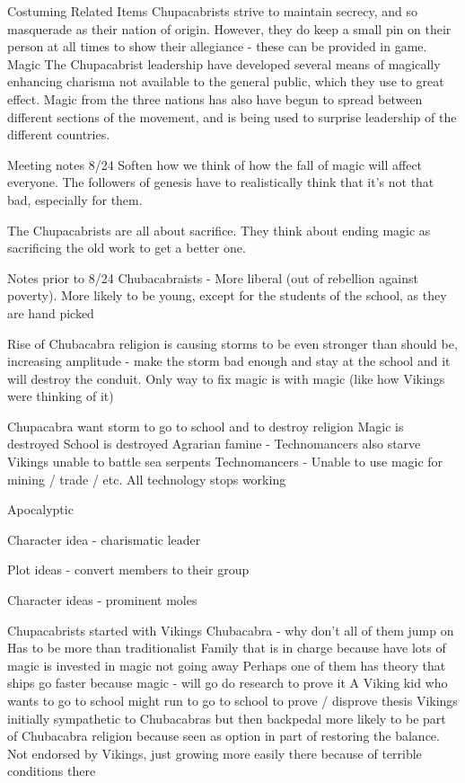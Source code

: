 \documentclass[blue]{GL2020}
\begin{document}
Costuming Related Items
Chupacabrists strive to maintain secrecy, and so masquerade as their nation of origin. However, they do keep a small pin on their person at all times to show their allegiance - these can be provided in game.
Magic
The Chupacabrist leadership have developed several means of magically enhancing charisma not available to the general public, which they use to great effect. Magic from the three nations has also have begun to spread between different sections of the movement, and is being used to surprise leadership of the different countries.

Meeting notes 8/24
Soften how we think of how the fall of magic will affect everyone. The followers of genesis have to realistically think that it’s not that bad, especially for them.

The Chupacabrists are all about sacrifice. They think about ending magic as sacrificing the old work to get a better one.

Notes prior to 8/24
Chubacabraists - More liberal (out of rebellion against poverty). More likely to be young, except for the students of the school, as they are hand picked

Rise of Chubacabra religion is causing storms to be even stronger than should be, increasing amplitude - make the storm bad enough and stay at the school and it will destroy the conduit.  Only way to fix magic is with magic (like how Vikings were thinking of it)

Chupacabra want storm to go to school and to destroy religion
Magic is destroyed
School is destroyed
Agrarian famine - Technomancers also starve
Vikings unable to battle sea serpents
Technomancers - Unable to use magic for mining / trade / etc.  All technology stops working

Apocalyptic

Character idea - charismatic leader

Plot ideas - convert members to their group

Character ideas - prominent moles

Chupacabrists started with Vikings
Chubacabra - why don’t all of them jump on
Has to be more than traditionalist
Family that is in charge because have lots of magic is invested in magic not going away
Perhaps one of them has theory that ships go faster because magic - will go do research to prove it
A Viking kid who wants to go to school might run to go to school to prove / disprove thesis
Vikings initially sympathetic to Chubacabras but then backpedal
more likely to be part of Chubacabra religion because seen as option in part of restoring the balance.  Not endorsed by Vikings, just growing more easily there because of terrible conditions there
\end{document}
